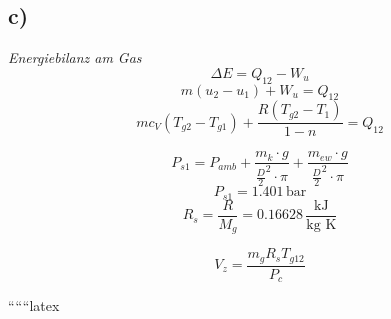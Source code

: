 

\subsection*{c)}
\textit{Energiebilanz am Gas}
\[
\Delta E = Q_{12} - W_u
\]
\[
m(u_2 - u_1) + W_u = Q_{12}
\]
\[
m c_V (T_{g2} - T_{g1}) + \frac{R (T_{g2} - T_1)}{1 - n} = Q_{12}
\]

\[
P_{s1} = P_{amb} + \frac{m_k \cdot g}{\frac{D}{2}^2 \cdot \pi} + \frac{m_{ew} \cdot g}{\frac{D}{2}^2 \cdot \pi}
\]
\[
P_{s1} = 1.401 \, \text{bar}
\]
\[
R_s = \frac{R}{M_g} = 0.16628 \, \frac{\text{kJ}}{\text{kg K}}
\]

\[
V_z = \frac{m_g R_s T_{g12}}{P_{c}}
\]

``````latex